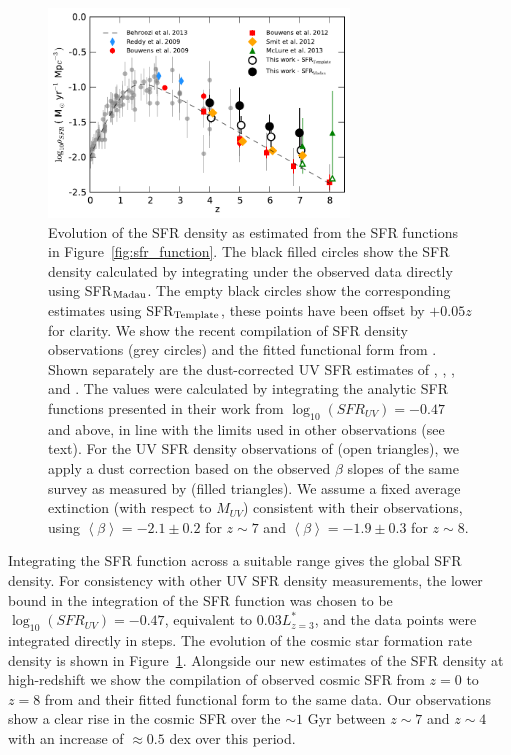 \begin{figure}
\centering
\includegraphics[width=80mm]{plots/fig15.pdf}
\caption[Short caption]{Evolution of the SFR density as estimated from the SFR functions in Figure~\ref{fig:sfr_function}. The black filled circles show the SFR density calculated by integrating under the observed data directly using SFR$_{\rm{Madau}}$. The empty black circles show the corresponding estimates using SFR$_{\rm{Template}}$, these points have been offset by $+0.05 z$ for clarity. We show the recent compilation of SFR density observations (grey circles) and the fitted functional form from \citet{Behroozi:2013fg}. Shown separately are the dust-corrected UV SFR estimates of \citet{Anonymous:r_woy2UF}, \citet{Bouwens:2009ik}, \citet{2012ApJ...754...83B},  \citet{Smit:2012is} and \citet{McLure:2013hh}. The \citet{Smit:2012is} values were calculated by integrating the analytic SFR functions presented in their work from $\log_{10}(SFR_{UV}) = -0.47$ and above, in line with the limits used in other observations (see text). For the UV SFR density observations of \citet{McLure:2013hh} (open triangles), we apply a dust correction based on the observed $\beta$ slopes of the same survey as measured by \citet{Dunlop:2013kp} (filled triangles). We assume a fixed average extinction (with respect to $M_{UV}$) consistent with their observations, using $\left \langle \beta \right \rangle = -2.1 \pm 0.2$ for $z \sim 7$ and $\left \langle \beta \right \rangle = -1.9 \pm 0.3$ for $z \sim 8$.}
\label{fig:sfr_density}
\end{figure}

Integrating the SFR function across a suitable range gives the global SFR density. For consistency with other UV SFR density measurements, the lower bound in the integration of the SFR function was chosen to be $\log_{10}(SFR_{UV}) = -0.47$, equivalent to $0.03 L^{*}_{z=3}$, and the data points were integrated directly in steps. The evolution of the cosmic star formation rate density is shown in Figure~\ref{fig:sfr_density}. Alongside our new estimates of the SFR density at high-redshift we show the compilation of observed cosmic SFR from $z=0$ to $z=8$ from \citet{Behroozi:2013fg} and their fitted functional form to the same data. Our observations show a clear rise in the cosmic SFR over the $\sim 1$ Gyr between $z\sim7$ and $z\sim4$ with an increase of $\approx 0.5$ dex over this period.

